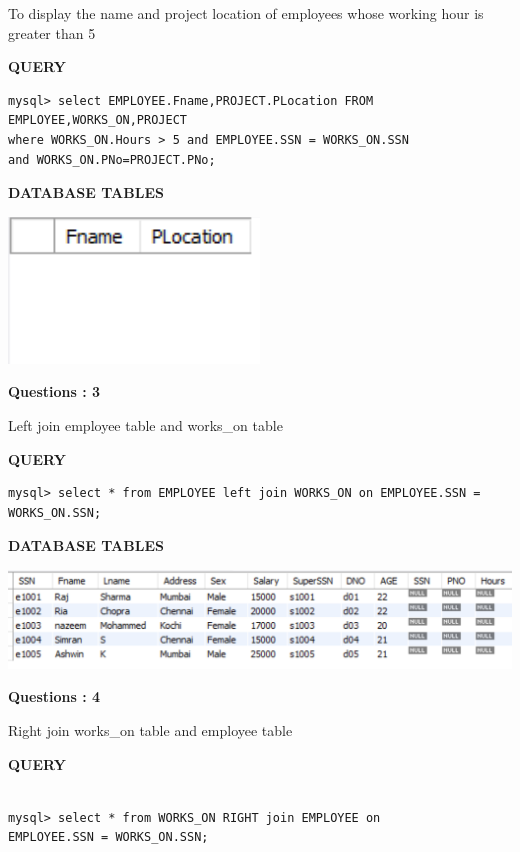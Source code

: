 \documentclass[a4paper,12pt]{report}
\begin{document}
To display the name and project location of employees whose working hour is greater than 5
	\begin{flushleft}
		\textbf{QUERY }
	\end{flushleft}
 \begin{verbatim}
mysql> select EMPLOYEE.Fname,PROJECT.PLocation FROM EMPLOYEE,WORKS_ON,PROJECT 
where WORKS_ON.Hours > 5 and EMPLOYEE.SSN = WORKS_ON.SSN 
and WORKS_ON.PNo=PROJECT.PNo;
 \end{verbatim}
\begin{flushleft}
		\textbf{DATABASE TABLES} 
\end{flushleft} 
\includegraphics[scale=1]{NQ2.png}
\begin{flushleft}
    \textbf{Questions : 3}
\end{flushleft}
Left join employee table and works\_on table
	\begin{flushleft}
		\textbf{QUERY }
	\end{flushleft}
 \begin{verbatim}
mysql> select * from EMPLOYEE left join WORKS_ON on EMPLOYEE.SSN = WORKS_ON.SSN;
 \end{verbatim}
\begin{flushleft}
		\textbf{DATABASE TABLES} 
\end{flushleft} 

\includegraphics[scale=1]{NQ3.png}
\begin{flushleft}
    \textbf{Questions : 4}
\end{flushleft}
Right join works\_on table and employee table
	\begin{flushleft}
		\textbf{QUERY }
	\end{flushleft}
 \begin{verbatim}
 
mysql> select * from WORKS_ON RIGHT join EMPLOYEE on 
EMPLOYEE.SSN = WORKS_ON.SSN;

 \end{verbatim}
 
\end{document}
